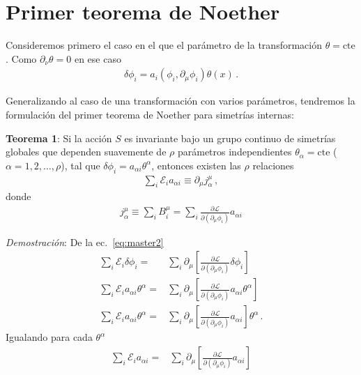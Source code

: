 \section{Primer teorema de Noether}

Consideremos primero el caso en el que el parámetro de la transformación $\theta=\text{cte}$. Como $\partial_{\nu}\theta=0$ en ese caso
\begin{align}
\label{eq:infdt}
 \delta\phi_i= a_{i}\left( \phi_{i},\partial_{\mu}\phi_{i} \right) \theta(x)\,.
\end{align}




Generalizando al caso de una transformación con varios parámetros, tendremos la formulación del primer teorema de Noether para simetrías internas:

\textbf{Teorema 1}: Si la acción $S$ es invariante bajo un grupo continuo de simetrías globales que dependen suavemente de $\rho$ parámetros independientes $\theta_{\alpha}=\text{cte}$ ($\alpha=1,2,\ldots, \rho$), tal que $\delta\phi_i=a_{\alpha i}\theta^{\alpha}$, entonces existen las $\rho$ relaciones
\begin{align}
\sum_{i}\mathcal{E}_i a_{\alpha i}\equiv \partial_{\mu} j^{\mu}_{\alpha}\,,  
\end{align}
donde
\begin{align}
j^{\mu}_{\alpha}\equiv \sum_{i}B^{\mu}_i=\sum_{i}  \frac{\partial\mathcal{L}}{\partial(\partial_{\mu}\phi_i)}a_{\alpha i}
\end{align}

\emph{Demostración}:  De la ec.~\eqref{eq:master2}
\begin{align}
\label{eq:varprin}
  \sum_i \mathcal{E}_i \delta\phi_i =&\sum_{i} \partial_{\mu} \left[\frac{\partial\mathcal{L}}{\partial(\partial_{\mu}\phi_i)}\delta\phi_{i}  \right] \nonumber\\
  \sum_i \mathcal{E}_i a_{\alpha i}\theta^{\alpha} =&\sum_{i} \partial_{\mu} \left[\frac{\partial\mathcal{L}}{\partial(\partial_{\mu}\phi_i)} a_{\alpha i}\theta^{\alpha}  \right] \nonumber\\
  \sum_i \mathcal{E}_i a_{\alpha i}\theta^{\alpha} =&\sum_{i} \partial_{\mu} \left[\frac{\partial\mathcal{L}}{\partial(\partial_{\mu}\phi_i)} a_{\alpha i}  \right]\theta^{\alpha}\,.
\end{align}
Igualando para cada $\theta^{\alpha}$
\begin{align}
    \sum_i \mathcal{E}_i a_{\alpha i} =&\sum_{i} \partial_{\mu} \left[\frac{\partial\mathcal{L}}{\partial(\partial_{\mu}\phi_i)} a_{\alpha i}  \right]
\end{align}

